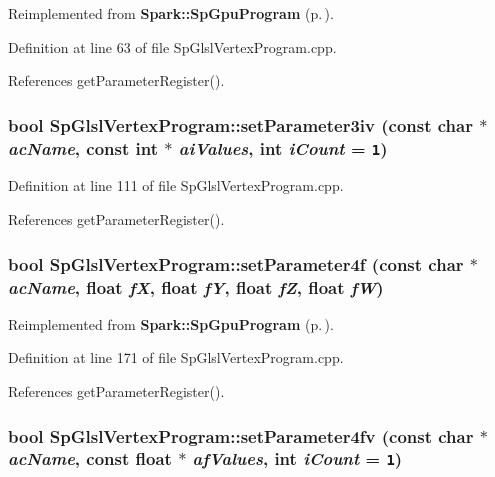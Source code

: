 Reimplemented from {\bf Spark::Sp\-Gpu\-Program} {\rm (p.\,\pageref{classSpark_1_1SpGpuProgram_a14})}.

Definition at line 63 of file Sp\-Glsl\-Vertex\-Program.cpp.

References get\-Parameter\-Register().
\subsubsection{\setlength{\rightskip}{0pt plus 5cm}bool Sp\-Glsl\-Vertex\-Program::set\-Parameter3iv (const char $\ast$ {\em ac\-Name}, const int $\ast$ {\em ai\-Values}, int {\em i\-Count} = {\tt 1})\hspace{0.3cm}{\tt  [virtual]}}\label{classSpark_1_1SpGlslVertexProgram_a7}


Definition at line 111 of file Sp\-Glsl\-Vertex\-Program.cpp.

References get\-Parameter\-Register().
\subsubsection{\setlength{\rightskip}{0pt plus 5cm}bool Sp\-Glsl\-Vertex\-Program::set\-Parameter4f (const char $\ast$ {\em ac\-Name}, float {\em f\-X}, float {\em f\-Y}, float {\em f\-Z}, float {\em f\-W})\hspace{0.3cm}{\tt  [virtual]}}\label{classSpark_1_1SpGlslVertexProgram_a12}




Reimplemented from {\bf Spark::Sp\-Gpu\-Program} {\rm (p.\,\pageref{classSpark_1_1SpGpuProgram_a23})}.

Definition at line 171 of file Sp\-Glsl\-Vertex\-Program.cpp.

References get\-Parameter\-Register().
\subsubsection{\setlength{\rightskip}{0pt plus 5cm}bool Sp\-Glsl\-Vertex\-Program::set\-Parameter4fv (const char $\ast$ {\em ac\-Name}, const float $\ast$ {\em af\-Values}, int {\em i\-Count} = {\tt 1})\hspace{0.3cm}{\tt  [virtual]}}\label{classSpark_1_1SpGlslVertexProgram_a16}




